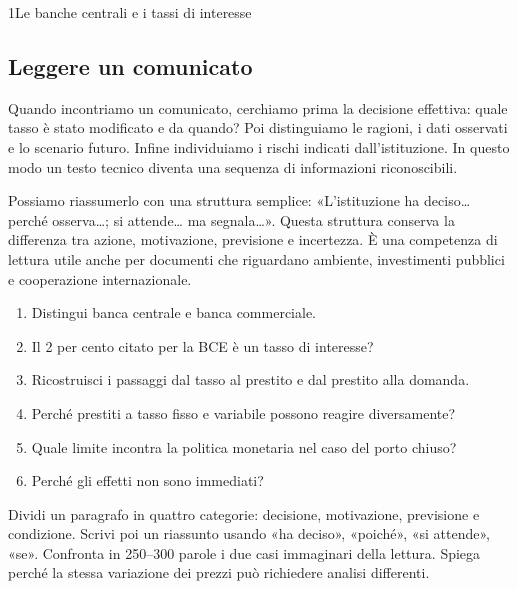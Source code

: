 \begin{lettura}{1}{Le banche centrali e i tassi di interesse}
\subsection*{Leggere un comunicato}
Quando incontriamo un comunicato, cerchiamo prima la decisione effettiva: quale tasso è stato modificato e da quando? Poi distinguiamo le ragioni, i dati osservati e lo scenario futuro. Infine individuiamo i rischi indicati dall'istituzione. In questo modo un testo tecnico diventa una sequenza di informazioni riconoscibili.

Possiamo riassumerlo con una struttura semplice: «L'istituzione ha deciso… perché osserva…; si attende… ma segnala…». Questa struttura conserva la differenza tra azione, motivazione, previsione e incertezza. È una competenza di lettura utile anche per documenti che riguardano ambiente, investimenti pubblici e cooperazione internazionale.


\attivita
\begin{enumerate}

\item Distingui banca centrale e banca commerciale.

\item Il 2 per cento citato per la BCE è un tasso di interesse?

\item Ricostruisci i passaggi dal tasso al prestito e dal prestito alla domanda.

\item Perché prestiti a tasso fisso e variabile possono reagire diversamente?

\item Quale limite incontra la politica monetaria nel caso del porto chiuso?

\item Perché gli effetti non sono immediati?

\end{enumerate}
\lessico








\lingua
Dividi un paragrafo in quattro categorie: decisione, motivazione, previsione e condizione. Scrivi poi un riassunto usando «ha deciso», «poiché», «si attende», «se».
\scrittura
Confronta in 250--300 parole i due casi immaginari della lettura. Spiega perché la stessa variazione dei prezzi può richiedere analisi differenti.

\end{lettura}


